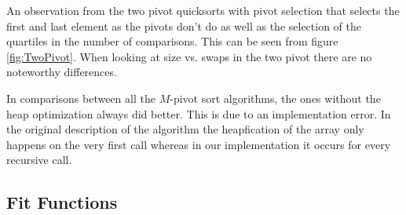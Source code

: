 		

		
		An observation from the two pivot quicksorts with pivot selection that selects the first and last element as the pivots don't do as well as the selection of the quartiles in the number of comparisons. This can be seen from figure \ref{fig:TwoPivot}. When looking at size vs. swaps in the two pivot there are no noteworthy differences. 
		
		
		

		In comparisons between all the $M$-pivot sort algorithms, the ones without the heap optimization always did better. This is due to an implementation error. In the original description of the algorithm the heapfication of the array only happens on the very first call whereas in our implementation it occurs for every recursive call.


	\subsection{Fit Functions}
		
